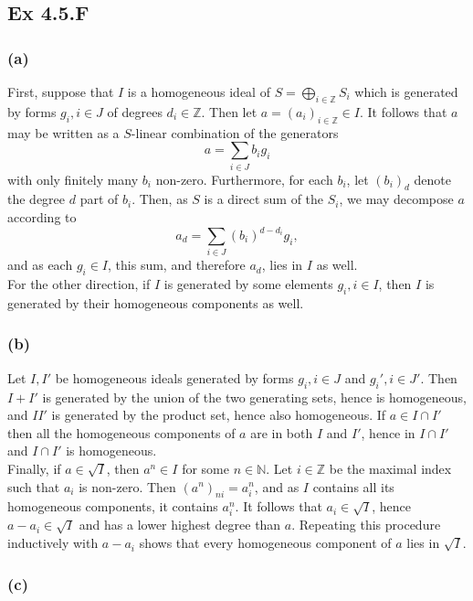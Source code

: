 \documentclass{article}
\theoremstyle{definition}
\newcommand{\Z}{\mathbb{Z}}
\newcommand{\N}{\mathbb{N}}
\begin{document}
\subsection*{Ex 4.5.F}
\subsubsection*{(a)}

First, suppose that $I$ is a homogeneous ideal of $S = \bigoplus_{i \in \Z}
	S_i$ which is generated by forms $g_i, i \in J$ of degrees $d_i \in \Z$.
Then let $a = (a_i)_{i \in \Z} \in I$. It follows that $a$ may be written as a
$S$-linear combination of the generators
\[
	a
	=
	\sum_{i \in J} b_i g_i
\]
with only finitely many $b_i$ non-zero. Furthermore, for each $b_i$, let
$(b_i)_{d}$ denote the degree $d$ part of $b_i$. Then, as $S$ is a direct sum
of the $S_i$, we may decompose $a$ according to
\[
	a_d
	=
	\sum_{i \in J}
	(b_i)^{d - d_i}g_i,
\]
and as each $g_i \in I$, this sum, and therefore $a_d$, lies in $I$ as well. \\

For the other direction, if $I$ is generated by some elements $g_i, i \in I$,
then $I$ is generated by their homogeneous components as well.

\subsubsection*{(b)}

Let $I, I'$ be homogeneous ideals generated by forms $g_i, i \in J$ and $g_i',
	i \in J'$. Then $I + I'$ is generated by the union of the two generating sets,
hence is homogeneous, and $II'$ is generated by the product set, hence also
homogeneous. If $a \in I \cap I'$ then all the homogeneous components of $a$
are in both $I$ and $I'$, hence in $I \cap I'$ and $I \cap I'$ is homogeneous. \\

Finally, if $a \in \sqrt{I}$, then $a^n \in I$ for some $n \in \N$. Let $i \in
	\Z$ be the maximal index such that $a_i$ is non-zero. Then $(a^n)_{ni} =
	a_i^n$, and as $I$ contains all its homogeneous components, it contains
$a_i^n$. It follows that $a_i \in \sqrt{I}$, hence $a - a_i \in \sqrt{I}$ and
has a lower highest degree than $a$. Repeating this procedure inductively with
$a - a_i$ shows that every homogeneous component of $a$ lies in $\sqrt{I}$.

\subsubsection*{(c)}
\end{document}
